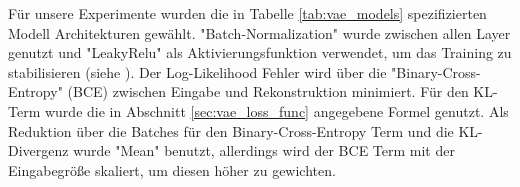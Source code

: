 Für unsere Experimente wurden die in Tabelle \ref{tab:vae_models} spezifizierten Modell Architekturen gewählt. "Batch-Normalization" wurde zwischen allen Layer genutzt und "LeakyRelu" als Aktivierungsfunktion verwendet, um das Training zu stabilisieren (siehe \cite{Garay-Maestre2019}). Der Log-Likelihood Fehler wird über die "Binary-Cross-Entropy" (BCE) zwischen Eingabe und Rekonstruktion minimiert. Für den KL-Term wurde die in Abschnitt \ref{sec:vae_loss_func} angegebene Formel genutzt. Als Reduktion über die Batches für den Binary-Cross-Entropy Term und die KL-Divergenz wurde "Mean" benutzt, allerdings wird der BCE Term mit der Eingabegröße skaliert, um diesen höher zu gewichten.

\begin{table}[t]
\centering
{}
\end{table}

